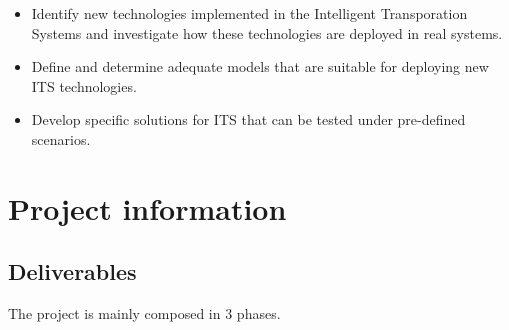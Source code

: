 \documentclass[]{book}
\providecommand{\tightlist}{%
  \setlength{\itemsep}{0pt}\setlength{\parskip}{0pt}}
\theoremstyle{definition}
\theoremstyle{definition}
\theoremstyle{definition}
\theoremstyle{remark}
\begin{document}
\begin{itemize}
\tightlist
\item
  Identify new technologies implemented in the Intelligent Transporation
  Systems and investigate how these technologies are deployed in real
  systems.
\item
  Define and determine adequate models that are suitable for deploying
  new ITS technologies.
\item
  Develop specific solutions for ITS that can be tested under
  pre-defined scenarios.
\end{itemize}

\hypertarget{project-information}{%
\chapter*{Project information}\label{project-information}}

\hypertarget{deliverables}{%
\section*{Deliverables}\label{deliverables}}

The project is mainly composed in 3 phases.
\end{document}
